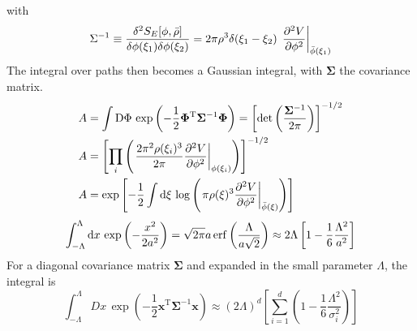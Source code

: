 with \[ \Sigma^{-1} \equiv \frac{\delta ^2 S_E[\phi,\bar\rho]}{\delta \phi(\xi_1) \delta\phi(\xi_2)} = 2 \pi \rho^3 \delta(\xi_1-\xi_2) \, \left. \frac{\partial ^2V}{\partial \phi^2} \right\rvert_{\bar\phi(\xi_1)} \]
The integral over paths then becomes a Gaussian integral, with $\mathbf\Sigma$ the covariance matrix.
\begin{align*}
 A &= \int \mathrm D \Phi \, \exp \left( -\frac12 \mathbf\Phi^{\mathrm T} \mathbf\Sigma^{-1} \mathbf\Phi \right) = \left[ \det \left( \frac{ \mathbf\Sigma^{-1} }{2\pi} \right) \right]^{-1/2} \\
 A &= \left[ \prod_i \left( \left. \frac{2\pi^2 \rho(\xi_i)^3}{2\pi} \frac{\partial ^2V}{\partial \phi^2} \right\rvert_{\phi(\xi_i)} \right)  \right]^{-1/2} \\
 A &= \exp \left[ -\frac12 \int \mathrm d\xi \, \log \left( \left. \pi \rho(\xi)^3 \frac{\partial ^2V}{\partial \phi^2} \right\rvert_{\bar\phi(\xi)} \right)  \right]
\end{align*}
 \[ \int_{-\Lambda}^{\Lambda} \mathrm d x \, \exp \left( -\frac{x^2}{2a^2} \right) = \sqrt{2\pi} a \, \mathrm{erf} \left( \frac{\Lambda}{a\sqrt{2}} \right) \approx 2\Lambda \left[ 1 - \frac16 \frac{\Lambda^2}{a^2} \right] \]
 For a diagonal covariance matrix $\mathbf \Sigma$ and expanded in the small parameter $\Lambda$, the integral is
 \[ \int_{-\Lambda}^{\Lambda} Dx \, \exp \left( -\frac12 \mathbf x^{\mathrm T} \mathbf \Sigma^{-1} \mathbf x \right) \approx (2 \Lambda)^{d} \left[ \sum_{i=1}^d \left( 1 - \frac16 \frac{\Lambda^2}{\sigma_i^2} \right) \right] \]


